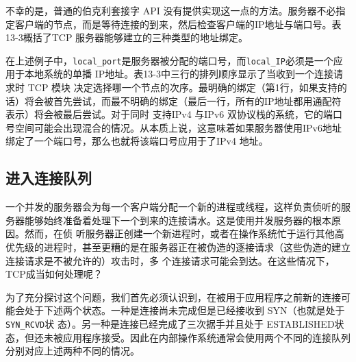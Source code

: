 不幸的是，普通的伯克利套接字 API
没有提供实现这一点的方法。服务器不必指定客户端的节点，而是等待连接的到来，然后检查客户端的IP地址与端口号。表13-3概括了TCP
服务器能够建立的三种类型的地址绑定。

在上述例子中，\verb|local_port|是服务器被分配的端口号，而\verb|local_IP|必须是一个应用于本地系统的单播
IP地址。表13-3中三行的排列顺序显示了当收到一个连接请求时 TCP 模块
决定选择哪一个节点的次序。最明确的绑定（第1行，如果支持的话）将会被首先尝试，而最不明确的绑定（最后一行，所有的IP地址都用通配符表示）将会被最后尝试。对于同时
支持IPv4 与IPv6
双协议栈的系统，它的端口号空间可能会出现混合的情况。从本质上说，这意味着如果服务器使用IPv6地址绑定了一个端口号，那么也就将该端口号应用于了IPv4
地址。
\subsection{进入连接队列}
一个并发的服务器会为每一个客户端分配一个新的进程或线程，这样负责侦听的服务器能够始终准备着处理下一个到来的连接请水。这是使用并发服务器的根本原因。然而，在侦
听服务器正创建一个新进程时，或者在操作系统忙于运行其他高优先级的进程时，甚至更糟的是在服务器正在被伪造的逐接请求（这些伪造的建立连接请求是不被允许的）攻击时，多
个连接请求可能会到达。在这些情况下，TCP成当如何处理呢？

为了充分探讨这个问题，我们首先必须认识到，在被用于应用程序之前新的连接可能会处于下述两个状态。一种是连接尚未完成但是已经接收到
SYN（也就是处于 \verb|SYN_RCVD|状
态）。另一种是连接已经完成了三次据手并且处于
ESTABLISHED状态，但还未被应用程序接受。因此在内部操作系统通常会使用两个不同的连接队列分别对应上述两种不同的情况。


